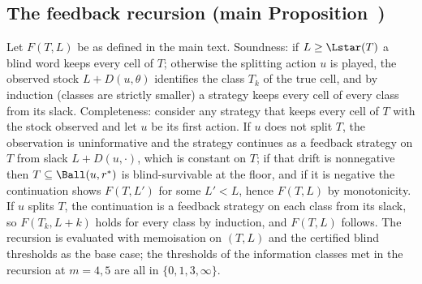 \subsection{The feedback recursion (main Proposition~)}
Let $F(T,L)$ be as defined in the main text. Soundness: if $L\ge\Lstar(T)$ a blind word keeps every cell of $T$; otherwise the splitting action $u$ is played, the observed stock $L+D(u,\theta)$ identifies the class $T_k$ of the true cell, and by induction (classes are strictly smaller) a strategy keeps every cell of every class from its slack. Completeness: consider any strategy that keeps every cell of $T$ with the stock observed and let $u$ be its first action. If $u$ does not split $T$, the observation is uninformative and the strategy continues as a feedback strategy on $T$ from slack $L+D(u,\cdot)$, which is constant on $T$; if that drift is nonnegative then $T\subseteq\Ball(u,r^\ast)$ is blind-survivable at the floor, and if it is negative the continuation shows $F(T,L')$ for some $L'<L$, hence $F(T,L)$ by monotonicity. If $u$ splits $T$, the continuation is a feedback strategy on each class from its slack, so $F(T_k,L+k)$ holds for every class by induction, and $F(T,L)$ follows. The recursion is evaluated with memoisation on $(T,L)$ and the certified blind thresholds as the base case; the thresholds of the information classes met in the recursion at $m=4,5$ are all in $\{0,1,3,\infty\}$.
